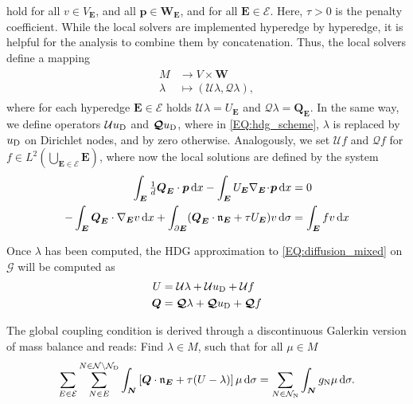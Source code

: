 \documentclass[a4paper, english, 12pt, reqno, draft]{amsart}
\theoremstyle{definition}
\theoremstyle{remark}
\numberwithin{equation}{section}
\newcommand{\setEdge}{\ensuremath{\mathcal E}}
\newcommand{\setNode}{\ensuremath{\mathcal N}}
\newcommand{\setNodeDir}{\ensuremath{\setNode_\textup D}}
\newcommand{\setNodeNeu}{\ensuremath{\setNode_\textup N}}
\newcommand{\edge}{\ensuremath{E}}
\newcommand{\node}{\ensuremath{N}}
\newcommand{\Graph}{\ensuremath{\boldsymbol{\mathcal G}}}
\newcommand{\SetEdge}{\ensuremath{\boldsymbol{\mathcal E}}}
\newcommand{\Edge}{{\ensuremath{\boldsymbol E}}}
\newcommand{\Node}{{\ensuremath{\boldsymbol N}}}
\newcommand{\Nabla}{\ensuremath{\nabla_\Edge}}
\newcommand{\Div}{\ensuremath{\Nabla\!\cdot\!}}
\newcommand{\Normal}{\ensuremath{\mathfrak n_\Edge}}
\newcommand{\skeletalSpace}{\ensuremath{M}}
\newcommand{\discElementSpace}{\ensuremath{V}}
\renewcommand{\vec}[1]{\ensuremath{\boldsymbol{#1}}}
\newcommand{\dx}{\ensuremath{\, \textup d x}}
\newcommand{\ds}{\ensuremath{\, \textup d \sigma}}
\newcommand{\localU}{\ensuremath{\mathcal U}}
\newcommand{\localQ}{\ensuremath{\vec{\mathcal Q}}}
\begin{document}
% 
hold for all $v \in V_\Edge$, and all $\vec p \in \vec W_\Edge$, and for all $\Edge \in \SetEdge$. Here, $\tau > 0$ is the penalty coefficient. While the local solvers are implemented hyperedge by hyperedge, it is helpful for the analysis to combine them by concatenation. Thus, the local solvers define a mapping
% 
\begin{gather}
 \begin{split}
  \skeletalSpace & \to \discElementSpace \times \vec W\\
  \lambda &\mapsto (\localU \lambda, \localQ \lambda),
 \end{split}
\end{gather}
% 
where for each hyperedge $\Edge \in \SetEdge$ holds $\localU \lambda = U_\Edge$ and $\localQ \lambda = \vec Q_\Edge$. In the same way, we define operators $\localU u_\textup D$ and $ \localQ u_\textup D$, where in \eqref{EQ:hdg_scheme}, $\lambda$ is replaced by $u_\textup D$ on Dirichlet nodes, and by zero otherwise. Analogously, we set  $\localU f$ and $ \localQ f$ for
$f\in L^2(\bigcup_{\Edge \in \SetEdge} \Edge)$, where now the local solutions are defined by the system
% 
\begin{subequations}\label{EQ:hdg_f}
 \begin{align}
  \int_\Edge \tfrac{1}{d} \vec Q_\Edge \cdot \vec p \dx - \int_\Edge U_\Edge \Div \vec p \dx & = 0 \label{EQ:hdg_f_primary}\\
  - \int_\Edge \vec Q_\Edge \cdot \Nabla v \dx  + \int_{\partial \Edge} ( \vec Q_\Edge \cdot \Normal + \tau U_\Edge ) v \ds & =  \int_{\Edge} f v \dx\label{EQ:hdg_f_flux}
 \end{align}
\end{subequations}

Once $\lambda$ has been computed, the HDG approximation
to \eqref{EQ:diffusion_mixed} on $\Graph$ will be computed as
% 
\begin{gather}
  \begin{split}
    U &= \localU \lambda + \localU u_\textup D + \localU f\\
    \vec Q &= \localQ \lambda + \localQ u_\textup D + \localQ f
  \end{split}
\end{gather}

The global coupling condition is derived through a discontinuous
Galerkin version of mass balance and reads: Find
$\lambda \in \skeletalSpace$, such that for all
$ \mu \in \skeletalSpace$
% 
\begin{equation}
 \sum_{\edge \in \setEdge} \sum^{\node \in \setNode \setminus \setNodeDir}_{\node \in \edge} \int_\Node \left[ \vec Q \cdot \Normal + \tau (U - \lambda) \right] \mu \ds = \sum_{\node \in \setNodeNeu} \int_\Node g_\textup N \mu \ds.\label{EQ:hdg_global}
\end{equation}
% 
\end{document}
